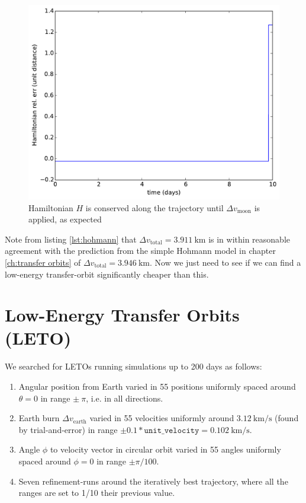 \begin{figure}[ht!]
\centering
\includegraphics[scale=0.35]{fig/hohmann/H_Hohmann.pdf}
\caption{Hamiltonian $H$ is conserved along the trajectory until $\Delta v_{\text{moon}}$ is applied, as expected}
\label{fig:hohmann-H}
\end{figure}
Note from listing \ref{lst:hohmann} that $\Delta v_{\text{total}} = \SI{3.911}{\km}$ is in within reasonable agreement with the prediction from the simple Hohmann model in chapter \ref{ch:transfer orbits} of $\Delta v_{\text{total}} = \SI{3.946}{\km}$. Now we just need to see if we can find a low-energy transfer-orbit significantly cheaper than this.


\section{Low-Energy Transfer Orbits (LETO)}
We searched for LETOs running simulations up to 200 days as follows:
\begin{enumerate}
    \item Angular position from Earth varied in 55 positions uniformly spaced around $\theta=0$ in range $\pm\ \pi$, i.e. in all directions.
    \item Earth burn $\Delta v_{\text{earth}}$ varied in 55 velocities uniformly around $\SI{3.12}{\km\per\s}$ (found by trial-and-error) in range $\pm 0.1*\texttt{unit\_velocity} = \SI{0.102}{\km\per\s}.$
    \item Angle $\phi$ to velocity vector in circular orbit varied in 55 angles uniformly spaced around $\phi=0$ in range $\pm \pi/100.$
    \item Seven refinement-runs around the iteratively best trajectory, where all the ranges are set to 1/10 their previous value.
\end{enumerate}

